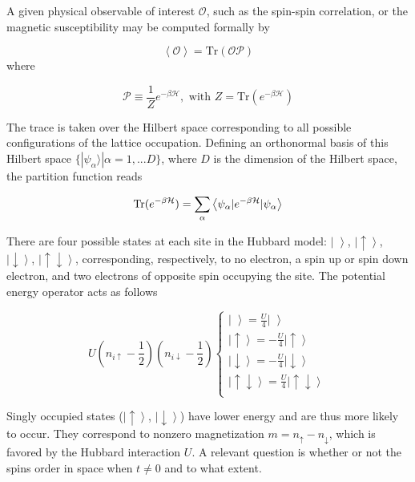 A given physical observable of interest $\mathcal{O}$, such as the spin-spin correlation, or the magnetic susceptibility may be computed formally by

\begin{equation}
\left\langle \mathcal{O} \right\rangle = \text{Tr} ( \mathcal{O} \mathcal{P} )
\end{equation}
where

\begin{equation}\label{eq:projection}
\mathcal{P} \equiv \frac{1}{Z} e^{-\beta \mathcal{H} } , \text{ with } Z = \text{Tr} ( e^{-\beta \mathcal{H} } )
\end{equation}

The trace is taken over the Hilbert space corresponding to all possible configurations of the lattice occupation.
Defining an orthonormal basis of this Hilbert space $\{ | \psi_\alpha \rangle | \alpha = 1, ... D \} $, where $D$ is the dimension of the Hilbert space, the partition function reads

\begin{equation}\label{eq:z_asEigen}
\operatorname{Tr} ( e^{-\beta \mathcal{H} } )= \sum_\alpha \left\langle \psi_\alpha | e^{-\beta \mathcal{H} } | \psi_\alpha \right\rangle
\end{equation}

There are four possible states at each site in the Hubbard model: $\left| \,\, \right\rangle$, $\left|\uparrow \right\rangle$, $\left|\downarrow\right \rangle$, $\left|\uparrow \downarrow \right\rangle $, corresponding, respectively, to no electron, a spin up or spin down electron, and two electrons of opposite spin occupying the site.
The potential energy operator acts as follows

\begin{equation}
U (n_{i\uparrow} - \frac{1}{2} ) ( n_{i\downarrow} - \frac{1}{2} ) 
\begin{cases}
\left| \,\, \right\rangle = \frac{U}{4} \left| \,\, \right\rangle \\
\left|\uparrow \right\rangle = -\frac{U}{4} \left|\uparrow \right\rangle \\
\left|\downarrow\right \rangle = -\frac{U}{4} \left|\downarrow\right \rangle \\
\left|\uparrow \downarrow \right\rangle = \frac{U}{4} \left|\uparrow \downarrow \right\rangle \\
\end{cases}
\end{equation}

Singly occupied states ($\left|\uparrow \right\rangle$, $\left|\downarrow\right \rangle$) have lower energy and are thus more likely to occur.
They correspond to nonzero magnetization $m = n_{\uparrow} - n_{\downarrow}$, which is favored by the Hubbard interaction $U$.
A relevant question is whether or not the spins order in space when $t \neq 0$ and to what extent.

